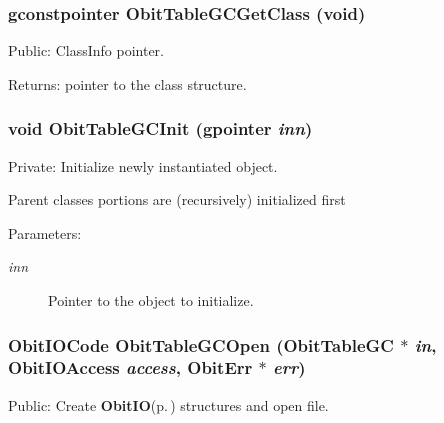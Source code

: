 \subsubsection{\setlength{\rightskip}{0pt plus 5cm}gconstpointer Obit\-Table\-GCGet\-Class (void)}\label{ObitTableGC_8c_a17}


Public: Class\-Info pointer. 

\begin{Desc}
\item[Returns:]pointer to the class structure. \end{Desc}
\subsubsection{\setlength{\rightskip}{0pt plus 5cm}void Obit\-Table\-GCInit (gpointer {\em inn})}\label{ObitTableGC_8c_a8}


Private: Initialize newly instantiated object. 

Parent classes portions are (recursively) initialized first \begin{Desc}
\item[Parameters:]
\begin{description}
\item[{\em inn}]Pointer to the object to initialize. \end{description}
\end{Desc}
\subsubsection{\setlength{\rightskip}{0pt plus 5cm}Obit\-IOCode Obit\-Table\-GCOpen ({\bf Obit\-Table\-GC} $\ast$ {\em in}, Obit\-IOAccess {\em access}, {\bf Obit\-Err} $\ast$ {\em err})}\label{ObitTableGC_8c_a21}


Public: Create {\bf Obit\-IO}{\rm (p.\,\pageref{structObitIO})} structures and open file. 

